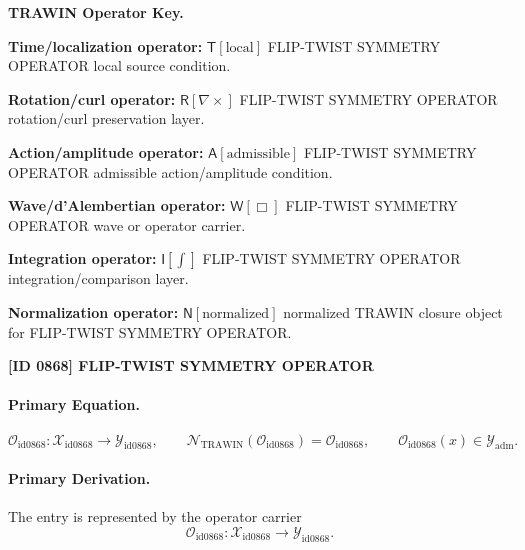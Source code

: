 \par\vspace{0.45\baselineskip}
\noindent\begin{minipage}[t]{\linewidth}
\begingroup
\small
\raggedright
\textbf{TRAWIN Operator Key.}\par
\noindent\textbf{Time/localization operator:} $\mathsf{T}\!\left[\mathrm{local}\right]$ FLIP-TWIST SYMMETRY OPERATOR local source condition.\par
\noindent\textbf{Rotation/curl operator:} $\mathsf{R}\!\left[\nabla\times\right]$ FLIP-TWIST SYMMETRY OPERATOR rotation/curl preservation layer.\par
\noindent\textbf{Action/amplitude operator:} $\mathsf{A}\!\left[\mathrm{admissible}\right]$ FLIP-TWIST SYMMETRY OPERATOR admissible action/amplitude condition.\par
\noindent\textbf{Wave/d'Alembertian operator:} $\mathsf{W}\!\left[\Box\right]$ FLIP-TWIST SYMMETRY OPERATOR wave or operator carrier.\par
\noindent\textbf{Integration operator:} $\mathsf{I}\!\left[\int\right]$ FLIP-TWIST SYMMETRY OPERATOR integration/comparison layer.\par
\noindent\textbf{Normalization operator:} $\mathsf{N}\!\left[\mathrm{normalized}\right]$ normalized TRAWIN closure object for FLIP-TWIST SYMMETRY OPERATOR.\par
\endgroup
\end{minipage}

\clearpage
\noindent\textbf{[ID 0868] FLIP-TWIST SYMMETRY OPERATOR}\par
\vspace{0.35em}
\paragraph{Primary Equation.}
\[
\mathcal{O}_{\mathrm{id0868}}:\mathcal{X}_{\mathrm{id0868}}\longrightarrow \mathcal{Y}_{\mathrm{id0868}},\qquad
\mathcal{N}_{\mathrm{TRAWIN}}(\mathcal{O}_{\mathrm{id0868}})=\mathcal{O}_{\mathrm{id0868}},\qquad
\mathcal{O}_{\mathrm{id0868}}(x)\in\mathcal{Y}_{\mathrm{adm}}.
\]

\paragraph{Primary Derivation.} The entry is represented by the operator carrier\[
\mathcal{O}_{\mathrm{id0868}}:\mathcal{X}_{\mathrm{id0868}}\longrightarrow \mathcal{Y}_{\mathrm{id0868}}.
\]

